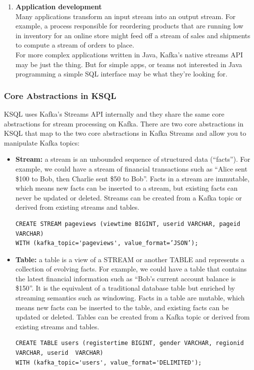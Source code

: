 \documentclass[10pt,a4paper]{article}
\begin{document}
\begin{enumerate}
\item \textbf{Application development} \\
Many applications transform an input stream into an output stream. For example, a process responsible for reordering products that are running low in inventory for an online store might feed off a stream of sales and shipments to compute a stream of orders to place. \\
For more complex applications written in Java, Kafka’s native streams API may be just the thing. But for simple apps, or teams not interested in Java programming a simple SQL interface may be what they’re looking for.
 \end{enumerate}
 
 \subsubsection{Core Abstractions in KSQL}
 KSQL uses Kafka’s Streams API internally and they share the same core abstractions for stream processing on Kafka. There are two core abstractions in KSQL that map to the two core abstractions in Kafka Streams and allow you to manipulate Kafka topics:
 \begin{itemize}
 	\item \textbf{Stream:} a stream is an unbounded sequence of structured data (“facts”).  For example, we could have a stream of financial transactions such as “Alice sent \$100 to Bob, then Charlie sent \$50 to Bob”. Facts in a stream are immutable, which means new facts can be inserted to a stream, but existing facts can never be updated or deleted. Streams can be created from a Kafka topic or derived from existing streams and tables.
 	\begin{verbatim}
CREATE STREAM pageviews (viewtime BIGINT, userid VARCHAR, pageid VARCHAR) 
WITH (kafka_topic='pageviews', value_format=’JSON’);
 	\end{verbatim}
 	\item \textbf{Table:} a table is a view of a STREAM or another TABLE and represents a collection of evolving facts.  For example, we could have a table that contains the latest financial information such as “Bob’s current account balance is \$150”.  It is the equivalent of a traditional database table but enriched by streaming semantics such as windowing.  Facts in a table are mutable, which means new facts can be inserted to the table, and existing facts can be updated or deleted.  Tables can be created from a Kafka topic or derived from existing streams and tables.
 	\begin{verbatim}
CREATE TABLE users (registertime BIGINT, gender VARCHAR, regionid VARCHAR, userid  VARCHAR) 
WITH (kafka_topic='users', value_format='DELIMITED');
 	\end{verbatim}
 \end{itemize}
 \pagebreak
\end{document}
